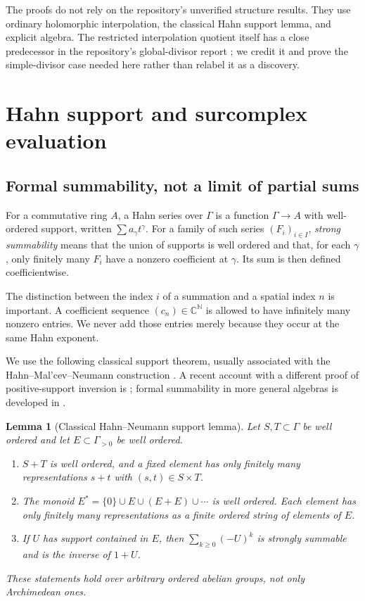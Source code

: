 \documentclass[11pt,letterpaper]{article}
\numberwithin{equation}{section}
\newtheorem{lemma}[theorem]{Lemma}
\theoremstyle{definition}
\theoremstyle{remark}
\newcommand{\C}{\mathbb C}
\newcommand{\N}{\mathbb N}
\begin{document}
The proofs do not rely on the repository's unverified structure results.
They use ordinary holomorphic interpolation, the classical Hahn support
lemma, and explicit algebra. The restricted interpolation quotient itself
has a close predecessor in the repository's global-divisor report
\cite{RepoGlobal}; we credit it and prove the simple-divisor case needed
here rather than relabel it as a discovery.

\section{Hahn support and surcomplex evaluation}\label{sec:hahn}

\subsection{Formal summability, not a limit of partial sums}
For a commutative ring $A$, a Hahn series over $\Gamma$ is a function
$\Gamma\to A$ with well-ordered support, written $\sum a_\gamma t^\gamma$.
For a family of such series $(F_i)_{i\in I}$, \emph{strong summability}
means that the union of supports is well ordered and that, for each
$\gamma$, only finitely many $F_i$ have a nonzero coefficient at
$\gamma$. Its sum is then defined coefficientwise.

The distinction between the index $i$ of a summation and a spatial index
$n$ is important. A coefficient sequence $(c_n)\in\C^\N$ is allowed to
have infinitely many nonzero entries. We never add those entries merely
because they occur at the same Hahn exponent.

We use the following classical support theorem, usually associated with
the Hahn--Mal'cev--Neumann construction \cite{Hahn,Neumann}. A recent
account with a different proof of positive-support inversion is
\cite{Poonen}; formal summability in more general algebras is developed in
\cite{BagayokoEtAl}.

\begin{lemma}[Classical Hahn--Neumann support lemma]\label{lem:neumann}
Let $S,T\subset\Gamma$ be well ordered and let
$E\subset\Gamma_{>0}$ be well ordered.
\begin{enumerate}
\item $S+T$ is well ordered, and a fixed element has only finitely many
      representations $s+t$ with $(s,t)\in S\times T$.
\item The monoid $E^*=\{0\}\cup E\cup(E+E)\cup\cdots$ is well ordered.
      Each element has only finitely many representations as a finite
      ordered string of elements of $E$.
\item If $U$ has support contained in $E$, then
      $\sum_{k\ge0}(-U)^k$ is strongly summable and is the inverse of
      $1+U$.
\end{enumerate}
These statements hold over arbitrary ordered abelian groups, not only
Archimedean ones.
\end{lemma}
\end{document}
